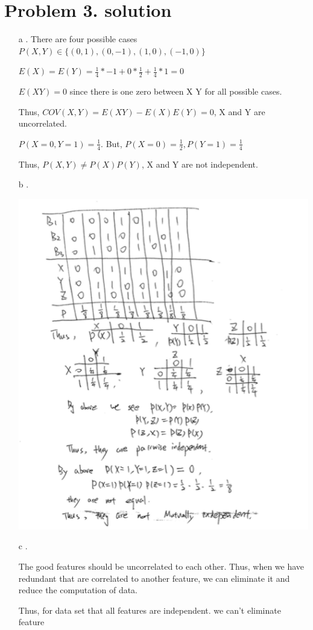 \documentclass[11pt]{article}
\begin{document}
\section*{Problem 3. solution}
\begin{itemize}
\item[a].
There are four possible cases $P(X, Y) \in \lbrace (0,1), (0, -1), (1, 0), (-1, 0) \rbrace$

$E(X) = E(Y) =  \frac{1}{4} * -1 + 0 * \frac{1}{2} + \frac{1}{4} * 1 = 0$

$E(XY) = 0$ since there is one zero between X Y for all possible cases.

Thus, $COV(X,Y) = E(XY) - E(X) E(Y) = 0$, X and Y are uncorrelated.

 $P(X = 0,Y = 1) = \frac{1}{4}$. But, $P(X = 0) = \frac{1}{2},P(Y = 1) = \frac{1}{4}$
 
Thus, $ P(X, Y) \neq P(X)P(Y)$, X and Y are not independent.
\item[b].

\includegraphics[scale=0.6]{q32}

\item[c].

The good features should be uncorrelated to each other. Thus, when we have redundant that are correlated to another feature, we can eliminate it and reduce the computation of data. 

Thus, for data set that all features are independent. we can't eliminate feature
\end{itemize}
\end{document}
